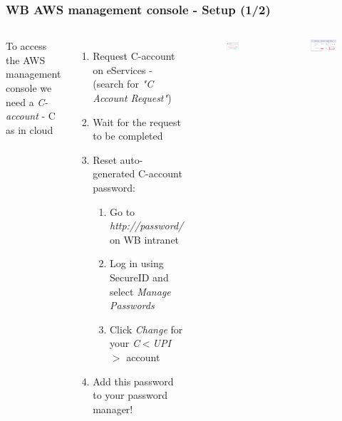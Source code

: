 \documentclass[aspectratio=169]{beamer} %
\begin{document}
\begin{frame}
	\frametitle{WB AWS management console - Setup (1/2)}
	\begin{columns}[c]


		To access the AWS management console we need a \textit{C-account} - C as in cloud

		\begin{enumerate}
			\item Request C-account on eServices 
			- (search for \textit{"C Account Request"})
			\item Wait for the request to be completed
			\item Reset auto-generated C-account password:
			\begin{enumerate}
				\item Go to \textit{http://password/} on WB intranet
				\item Log in using SecureID and select \textit{Manage Passwords}
				\item Click \textit{Change} for your \textit{C$<$UPI$>$} account
			\end{enumerate}
			\item Add this password to your password manager!
		\end{enumerate}

		\begin{figure}
			\centering
			\includegraphics[width=.5\textwidth]{./img/password-1.png}
		\end{figure}
		\vspace{.2cm}
		\begin{figure}
			\centering
			\includegraphics[width=1\textwidth]{./img/password-2.png}
		\end{figure}

	\end{columns}
\end{frame}
\end{document}
